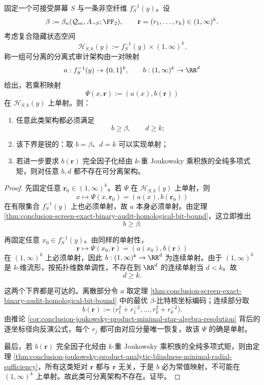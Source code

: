 \begin{theorem}[离散同调歧义与连续尺度盲性的加性最小外置定理]\label{thm:conclusion-screen-joukowsky-additive-minimal-externalization}
固定一个可接受屏幕 \(S\) 与一条非空纤维 \(f_S^{-1}(y)\)。设
\[
\beta:=\beta_n(\mathcal Q_m,A_{\neg S};\FF_2),
\qquad
\mathbf r=(r_1,\dots,r_k)\in (1,\infty)^k.
\]
考虑复合隐藏状态空间
\[
\mathcal H_{S,k}(y):=f_S^{-1}(y)\times (1,\infty)^k.
\]
称一组可分离的分离式审计架构由一对映射
\[
a:f_S^{-1}(y)\to \{0,1\}^b,
\qquad
b:(1,\infty)^k\to \RR^d
\]
给出，若乘积映射
\[
\Psi(x,\mathbf r):=(a(x),b(\mathbf r))
\]
在 \(\mathcal H_{S,k}(y)\) 上单射。则：
\begin{enumerate}
  \item 任意此类架构都必须满足
        \[
        b\ge \beta,
        \qquad
        d\ge k;
        \]
  \item 该下界是锐的：取 \(b=\beta\)、\(d=k\) 可以实现单射；
  \item 若进一步要求 \(b(\mathbf r)\) 完全因子化经由 \(k\)-重 Joukowsky 乘积族的全纯多项式矩，则对任意 \(b,d\) 都不存在可分离架构。
\end{enumerate}
\end{theorem}

\begin{proof}
先固定任意 \(\mathbf r_0\in (1,\infty)^k\)。若 \(\Psi\) 在 \(\mathcal H_{S,k}(y)\) 上单射，则
\[
x\longmapsto \Psi(x,\mathbf r_0)=(a(x),b(\mathbf r_0))
\]
在有限集合 \(f_S^{-1}(y)\) 上也必须单射，故 \(a\) 本身必须单射。由定理 \ref{thm:conclusion-screen-exact-binary-audit-homological-bit-bound}，这立即推出
\[
b\ge \beta.
\]

再固定任意 \(x_0\in f_S^{-1}(y)\)。由同样的单射性，
\[
\mathbf r\longmapsto \Psi(x_0,\mathbf r)=(a(x_0),b(\mathbf r))
\]
在 \((1,\infty)^k\) 上必须单射，因此 \(b:(1,\infty)^k\to \RR^d\) 为连续单射。由于 \((1,\infty)^k\) 是 \(k\)-维流形，按拓扑维数单调性，不存在到 \(\RR^d\) 的连续单射当 \(d<k\)。故
\[
d\ge k.
\]

这两个下界都是可达的。离散部分令 \(a\) 取定理 \ref{thm:conclusion-screen-exact-binary-audit-homological-bit-bound} 中的最优 \(\beta\)-比特核坐标编码；连续部分取
\[
b(\mathbf r):=\bigl(r_1^2+r_1^{-2},\dots,r_k^2+r_k^{-2}\bigr).
\]
由推论 \ref{cor:conclusion-joukowsky-product-minimal-star-algebra-resolution} 背后的逐坐标径向反演公式，每个 \(r_j\) 都可由对应分量唯一恢复，故该 \(\Psi\) 的确是单射。

最后，若 \(b(\mathbf r)\) 完全因子化经由 \(k\)-重 Joukowsky 乘积族的全纯多项式矩，则由定理 \ref{thm:conclusion-joukowsky-product-analytic-blindness-minimal-radial-sufficiency}，所有这类矩对 \(\mathbf r\) 都与 \(\mathbf r\) 无关，于是 \(b\) 必为常值映射，不可能在 \((1,\infty)^k\) 上单射。故此类可分离架构不存在。证毕。
\end{proof}

\endinput
